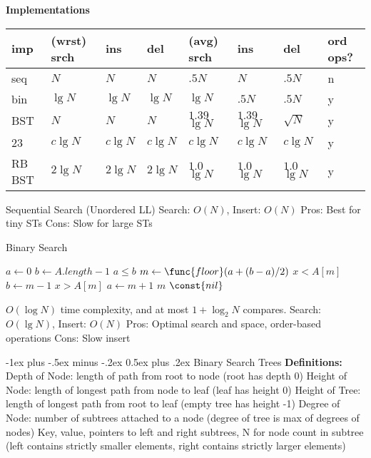 \documentclass[letterpaper, 8pt]{extarticle}
\makeatletter
\renewcommand{\section}{\@startsection{section}{1}{0mm}%
                                {-1ex plus -.5ex minus -.2ex}%
                                {0.5ex plus .2ex}%
                                {\normalfont\normalsize\bfseries}}
\makeatother
\begin{document}
\begin{multicols*}{5}
  \textbf{Implementations}
  \begin{tabulary}{\linewidth}{@{}LLLLLLLL@{}} \toprule
    imp    & (wrst) srch & ins       & del       & (avg) srch     & ins            & del           & ord ops? \\ \midrule
    seq    & $N$         & $N$       & $N$       & $.5 N$         & $N$            & $.5 N$        & n        \\
    bin    & $\lg N$     & $\lg N$   & $\lg N$   & $\lg N$        & $.5 N$         & $.5 N$        & y        \\
    BST    & $N$         & $N$       & $N$       & $1.39$ $\lg N$ & $1.39$ $\lg N$ & $\sqrt N$     & y        \\
    23     & $c \lg N$   & $c \lg N$ & $c \lg N$ & $c \lg N$      & $c \lg N$      & $c \lg N$     & y        \\
    RB BST & $2 \lg N$   & $2 \lg N$ & $2 \lg N$ & $1.0$ $\lg N$  & $1.0$ $\lg N$  & $1.0$ $\lg N$ & y        \\
    \bottomrule
  \end{tabulary}

  Sequential Search (Unordered LL)
  Search: $O(N)$, Insert: $O(N)$
  Pros: Best for tiny STs
  Cons: Slow for large STs

  Binary Search
  \begin{codebox}
    \li $a \gets 0$ 
    \li $b \gets A.length - 1$ 
    \li \While $a \leq b$
    \li   \Do $m \gets \func{floor}(a + (b - a) / 2)$
    \li     \If $x < A[m]$
    \li       \Do $b \gets m - 1$
    \li     \ElseIf $x > A[m]$
    \li       \Do $a \gets m + 1$
    \li     \Else \Return $m$
    \End
    \End
    \li \Return $\const{nil}$
  \end{codebox}
  $O(\log N)$ time complexity, and at most $1 + \log_2 N$ compares.
  Search: $O(\lg N)$, Insert: $O(N)$
  Pros: Optimal search and space, order-based operations
  Cons: Slow insert

  \section{Binary Search Trees}
  \textbf{Definitions:}
  Depth of Node: length of path from root to node (root has depth 0)
  Height of Node: length of longest path from node to leaf (leaf has height 0)
  Height of Tree: length of longest path from root to leaf (empty tree has height -1)
  Degree of Node: number of subtrees attached to a node (degree of tree is max of degrees of nodes)
  Key, value, pointers to left and right subtrees, N for node count in subtree (left contains strictly smaller elements, right contains strictly larger elements)


\end{multicols*}
\end{document}
